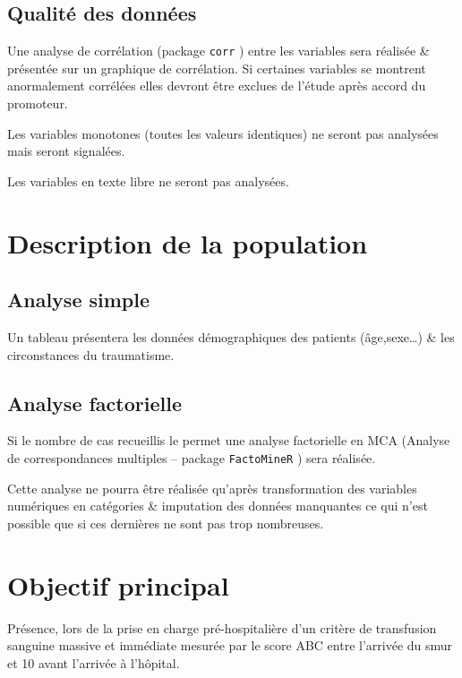 \documentclass[
  a4paper,
  french]{scrreprt}
\begin{document}
\section{Qualité des données}\label{qualituxe9-des-donnuxe9es}

Une analyse de corrélation (package \texttt{corr} \autocite{corr}) entre
les variables sera réalisée \& présentée sur un graphique de
corrélation. Si certaines variables se montrent anormalement corrélées
elles devront être exclues de l'étude après accord du promoteur.

Les variables monotones (toutes les valeurs identiques) ne seront pas
analysées mais seront signalées.

Les variables en texte libre ne seront pas analysées.

\chapter{Description de la
population}\label{description-de-la-population}

\section{Analyse simple}\label{analyse-simple}

Un tableau présentera les données démographiques des patients
(âge,sexe\dots) \& les circonstances du traumatisme.

\section{Analyse factorielle}\label{analyse-factorielle}

Si le nombre de cas recueillis le permet une analyse factorielle en MCA
(Analyse de correspondances multiples -- package \texttt{FactoMineR}
\autocite{facto}) sera réalisée.

Cette analyse ne pourra être réalisée qu'après transformation des
variables numériques en catégories \& imputation des données manquantes
ce qui n'est possible que si ces dernières ne sont pas trop nombreuses.

\chapter{Objectif principal}\label{objectif-principal}

\begin{tcolorbox}
Présence, lors de la prise en charge pré-hospitalière d’un critère de transfusion sanguine massive et immédiate mesurée par le score ABC entre l’arrivée du \gls{smur} et \qty{10}{\min} avant l’arrivée à l’hôpital.
\end{tcolorbox}
\end{document}
